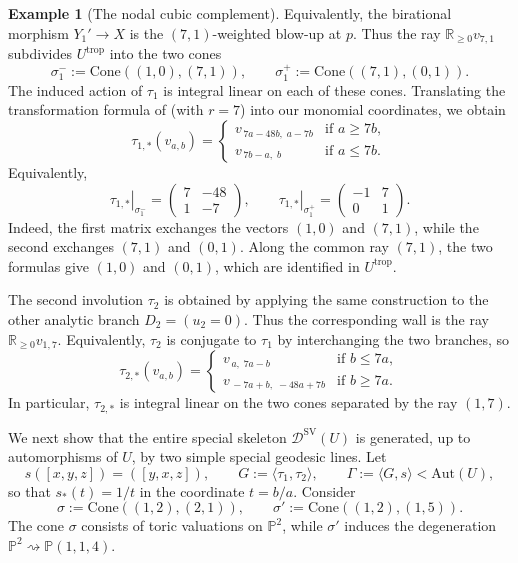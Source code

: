 \documentclass[reqno, 12pt]{amsart}
\theoremstyle{definition}
\newtheorem{expl}[prop]{Example}
\newcommand{\bP}{\mathbb{P}}
\newcommand{\bR}{\mathbb{R}}
\newcommand{\cD}{\mathcal{D}}
\newcommand{\Aut}{\mathrm{Aut}}
\newcommand{\trop}{\mathrm{trop}}
\newcommand{\SV}{\mathrm{SV}}
\newcommand{\Cone}{\mathrm{Cone}}
\numberwithin{equation}{section}
\begin{document}
\begin{expl}[The nodal cubic complement]
Equivalently, the birational morphism $Y_1'\to X$
is the $(7,1)$-weighted blow-up at $p$. Thus the ray
$\bR_{\geq0}v_{7,1}$ subdivides $U^{\trop}$ into the two cones
\[
\sigma_1^-:=\Cone((1,0),(7,1)),
\qquad
\sigma_1^+:=\Cone((7,1),(0,1)).
\]
The induced action of $\tau_1$ is integral linear on each of these cones.
Translating the transformation formula of
\cite[Proposition~30]{Kol24} (with $r=7$) into our monomial coordinates,
we obtain
\[
\tau_{1,*}(v_{a,b})
=
\begin{cases}
v_{\,7a-48b,\;a-7b} & \textrm {if } a\geq 7b,\\
v_{\,7b-a,\;b} & \textrm {if } a\leq 7b.
\end{cases}
\]
Equivalently,
\[
\left.\tau_{1,*}\right|_{\sigma_1^-}
=
\begin{pmatrix}
7&-48\\
1&-7
\end{pmatrix},
\qquad
\left.\tau_{1,*}\right|_{\sigma_1^+}
=
\begin{pmatrix}
-1&7\\
0&1
\end{pmatrix}.
\]
Indeed, the first matrix exchanges the vectors $(1,0)$ and $(7,1)$,
while the second exchanges $(7,1)$ and $(0,1)$. Along the common ray
$(7,1)$, the two formulas give $(1,0)$ and $(0,1)$,
which are identified in $U^{\trop}$.

The second involution $\tau_2$ is obtained by applying the same construction
to the other analytic branch $D_2=(u_2=0)$. Thus the corresponding wall is
the ray $\bR_{\geq 0}v_{1,7}$. Equivalently, $\tau_2$ is conjugate to
$\tau_1$ by interchanging the two branches, so
\[
\tau_{2,*}(v_{a,b})
=
\begin{cases}
v_{\,a,\;7a-b} & \textrm {if }b\leq 7a,\\
v_{\,-7a+b,\;-48a+7b} & \textrm {if } b\geq 7a.
\end{cases}
\]
In particular, $\tau_{2,*}$ is integral linear on the two cones separated
by the ray $(1,7)$.

We next show that the entire special skeleton $\cD^{\SV}(U)$ is generated, up to
automorphisms of $U$, by two simple special geodesic lines. Let
\[
s([x,y,z])=([y,x,z]),
\qquad
G:=\langle\tau_1,\tau_2\rangle,
\qquad
\Gamma:=\langle G,s\rangle<\Aut(U),
\]
so that $s_*(t)=1/t$ in the coordinate $t=b/a$. Consider
\[
\sigma:=\Cone((1,2),(2,1)),
\qquad
\sigma':=\Cone((1,2),(1,5)).
\]
The cone $\sigma$ consists of toric valuations on $\bP^2$, while
$\sigma'$ induces the degeneration
$\bP^2\rightsquigarrow\bP(1,1,4)$.


\end{expl}
\end{document}
